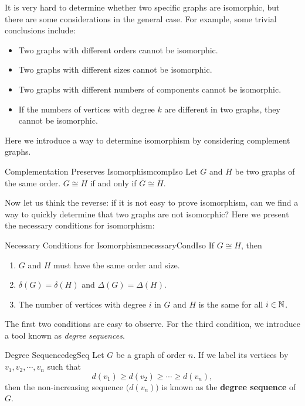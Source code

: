 \documentclass[math]{amznotes}
\theoremstyle{remark}
\begin{document}
It is very hard to determine whether two specific graphs are isomorphic, but there are some considerations in the general case. For example, some trivial conclusions include:
\begin{itemize}
    \item Two graphs with different orders cannot be isomorphic.
    \item Two graphs with different sizes cannot be isomorphic.
    \item Two graphs with different numbers of components cannot be isomorphic.
    \item If the numbers of vertices with degree $k$ are different in two graphs, they cannot be isomorphic.
\end{itemize}
Here we introduce a way to determine isomorphism by considering complement graphs.
\begin{probox}{Complementation Preserves Isomorphism}{compIso}
    Let $G$ and $H$ be two graphs of the same order. $G \cong H$ if and only if $\overline{G} \cong \overline{H}$.
\end{probox}
Now let us think the reverse: if it is not easy to prove isomorphism, can we find a way to quickly determine that two graphs are not isomorphic? Here we present the necessary conditions for isomorphism:
\begin{thmbox}{Necessary Conditions for Isomorphism}{necessaryCondIso}
    If $G \cong H$, then
    \begin{enumerate}
        \item $G$ and $H$ must have the same order and size.
        \item $\delta(G) = \delta(H)$ and $\Delta(G) = \Delta(H)$.
        \item The number of vertices with degree $i$ in $G$ and $H$ is the same for all $i \in \mathbb{N}$.
    \end{enumerate}
\end{thmbox}
The first two conditions are easy to observe. For the third condition, we introduce a tool known as \textit{degree sequences}.
\begin{dfnbox}{Degree Sequence}{degSeq}
    Let $G$ be a graph of order $n$. If we label its vertices by $v_1, v_2, \cdots, v_n$ such that
    \begin{equation*}
        d(v_1) \geq d(v_2) \geq \cdots \geq d(v_n),
    \end{equation*}
    then the non-increasing sequence $\bigl(d(v_n)\bigr)$ is known as the {\color{red} \textbf{degree sequence}} of $G$.
\end{dfnbox}
\end{document}
